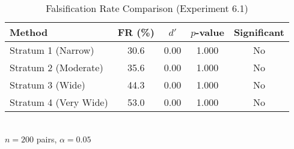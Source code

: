 \begin{table}[htbp]
\centering
\caption{Falsification Rate Comparison (Experiment 6.1)}
\label{tab:exp_6_1_results}
\begin{tabular}{lcccc}
\toprule
Method & FR (\%) & $d'$ & $p$-value & Significant \\ 
\midrule
Stratum 1 (Narrow) & 30.6 & 0.00 & 1.000 & No \\
Stratum 2 (Moderate) & 35.6 & 0.00 & 1.000 & No \\
Stratum 3 (Wide) & 44.3 & 0.00 & 1.000 & No \\
Stratum 4 (Very Wide) & 53.0 & 0.00 & 1.000 & No \\
\bottomrule
\end{tabular}
\\[0.5em] {\footnotesize $n=200$ pairs, $\alpha=0.05$}
\end{table}